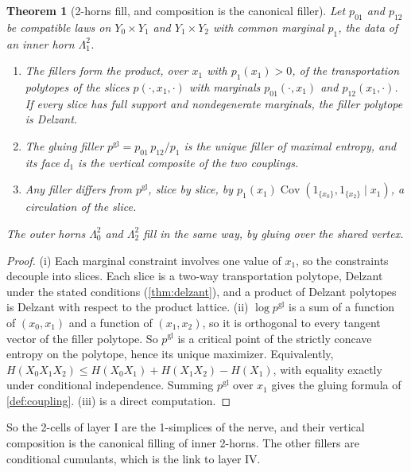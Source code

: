 \documentclass[11pt]{article}
\newtheorem{theorem}{Theorem}[section]
\theoremstyle{definition}
\theoremstyle{remark}
\begin{document}
\begin{theorem}[2-horns fill, and composition is the canonical filler]\label{thm:2horn}
Let $p_{01}$ and $p_{12}$ be compatible laws on $Y_0\times Y_1$ and $Y_1\times Y_2$ with common marginal $p_1$, the data of
an inner horn $\Lambda^2_1$.
\begin{enumerate}[label=(\roman*)]
\item The fillers form the product, over $x_1$ with $p_1(x_1)>0$, of the transportation polytopes of the slices
  $p(\cdot,x_1,\cdot)$ with marginals $p_{01}(\cdot,x_1)$ and $p_{12}(x_1,\cdot)$. If every slice has full support and
  nondegenerate marginals, the filler polytope is Delzant.
\item The gluing filler $p^{\mathrm{gl}}=p_{01}\,p_{12}/p_1$ is the unique filler of maximal entropy, and its face $d_1$ is the
  vertical composite of the two couplings.
\item Any filler differs from $p^{\mathrm{gl}}$, slice by slice, by $p_1(x_1)\operatorname{Cov}(1_{\{x_0\}},1_{\{x_2\}}\mid x_1)$, a
  circulation of the slice.
\end{enumerate}
The outer horns $\Lambda^2_0$ and $\Lambda^2_2$ fill in the same way, by gluing over the shared vertex.
\end{theorem}
\begin{proof}
(i) Each marginal constraint involves one value of $x_1$, so the constraints decouple into slices. Each slice is a
two-way transportation polytope, Delzant under the stated conditions (\cref{thm:delzant}), and a product of
Delzant polytopes is Delzant with respect to the product lattice. (ii) $\log p^{\mathrm{gl}}$ is a sum of a function of
$(x_0,x_1)$ and a function of $(x_1,x_2)$, so it is orthogonal to every tangent vector of the filler polytope. So
$p^{\mathrm{gl}}$ is a critical point of the strictly concave entropy on the polytope, hence its unique maximizer.
Equivalently, $H(X_0X_1X_2)\le H(X_0X_1)+H(X_1X_2)-H(X_1)$, with equality exactly under conditional independence.
Summing $p^{\mathrm{gl}}$ over $x_1$ gives the gluing formula of \cref{def:coupling}. (iii) is a direct computation.
\end{proof}

So the 2-cells of layer I are the 1-simplices of the nerve, and their vertical composition is the canonical
filling of inner 2-horns. The other fillers are conditional cumulants, which is the link to layer IV.
\end{document}
